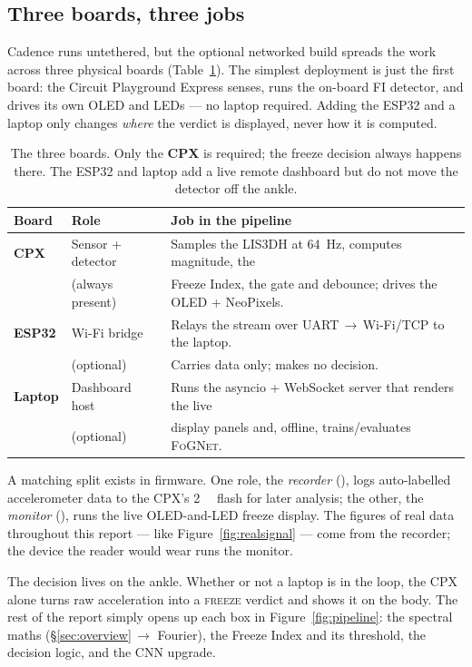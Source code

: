 \subsection{Three boards, three jobs}

Cadence runs untethered, but the optional networked build spreads the work across three
physical boards (Table~\ref{tab:boards}). The simplest deployment is just the first board:
the Circuit Playground Express senses, runs the on-board FI detector, and drives its own
OLED and LEDs --- no laptop required. Adding the ESP32 and a laptop only changes \emph{where}
the verdict is displayed, never how it is computed.

\begin{table}[H]
\centering
\small
\renewcommand{\arraystretch}{1.25}
\begin{tabular}{@{}>{\bfseries}l l l@{}}
\toprule
Board & Role & Job in the pipeline \\
\midrule
CPX & Sensor + detector & Samples the LIS3DH at \SI{64}{\hertz}, computes magnitude, the \\
    & (always present)  & Freeze Index, the gate and debounce; drives the OLED + NeoPixels. \\
ESP32 & Wi-Fi bridge & Relays the stream over \mbox{UART\,$\to$\,Wi-Fi/TCP} to the laptop. \\
      & (optional)   & Carries data only; makes no decision. \\
Laptop & Dashboard host & Runs the asyncio + WebSocket server that renders the live \\
       & (optional)     & display panels and, offline, trains/evaluates \textsc{FoGNet}. \\
\bottomrule
\end{tabular}
\caption{The three boards. Only the \textbf{CPX} is required; the freeze decision always
happens there. The ESP32 and laptop add a live remote dashboard but do not move the
detector off the ankle.}
\label{tab:boards}
\end{table}

A matching split exists in firmware. One role, the \emph{recorder}
(), logs auto-labelled accelerometer data to the CPX's
\SI{2}{\mega\byte} flash for later analysis; the other, the \emph{monitor}
(), runs the live OLED-and-LED freeze display. The figures
of real data throughout this report --- like Figure~\ref{fig:realsignal} --- come from the
recorder; the device the reader would wear runs the monitor.

\begin{keyidea}
The decision lives on the ankle. Whether or not a laptop is in the loop, the CPX alone
turns raw acceleration into a \textsc{freeze} verdict and shows it on the body. The rest of
the report simply opens up each box in Figure~\ref{fig:pipeline}: the spectral maths
(\S\ref{sec:overview}\,$\to$ Fourier), the Freeze Index and its threshold, the
decision logic, and the CNN upgrade.
\end{keyidea}
